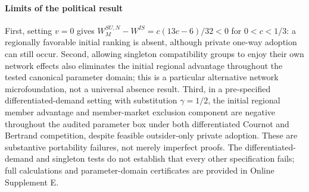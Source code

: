 \paragraph{Limits of the political result} First, setting $v=0$ gives $W_M^{SU,N}-W^{IS}=c(13c-6)/32<0$ for $0<c<1/3$: a regionally favorable initial ranking is absent, although private one-way adoption can still occur. Second, allowing singleton compatibility groups to enjoy their own network effects also eliminates the initial regional advantage throughout the tested canonical parameter domain; this is a particular alternative network microfoundation, not a universal absence result. Third, in a pre-specified differentiated-demand setting with substitution $\gamma=1/2$, the initial regional member advantage and member-market exclusion component are negative throughout the audited parameter box under both differentiated Cournot and Bertrand competition, despite feasible outsider-only private adoption. These are substantive portability failures, not merely imperfect proofs. The differentiated-demand and singleton tests do not establish that every other specification fails; full calculations and parameter-domain certificates are provided in Online Supplement E.
